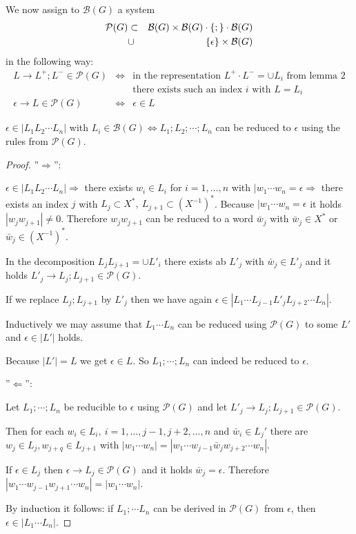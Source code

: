 We now assign to $\mathcal{B}(G)$ a system 
\begin{eqnarray*} 
\mathcal{P}(G) & \subset & \mathcal{B}(G) \times \mathcal{B}(G) \cdot \mbox{$\{;\}$}
\cdot \mathcal{B}(G) \\
& \cup & \mbox{$\{\epsilon\}$} \times \mathcal{B}(G)
\end{eqnarray*}
in the following way:
\begin{eqnarray*}
L \to L^+ ; L^- \in \mathcal{P}(G) & \iff & \text{in the representation } L^+
  \cdot L^- = \cup L_i \text{ from lemma 2} \\
  & & \text {there exists such an index $i$ with $L = L_i$} \\
\epsilon \to L \in \mathcal{P}(G) & \iff & \epsilon \in L
\end{eqnarray*}

\begin{lemma}
$\epsilon \in |L_1 L_2 \cdots L_n|$ with $L_i \in \mathcal{B}(G) \iff
L_1;L_2;\cdots ;L_n$ can be reduced to $\epsilon$ using the rules from
$\mathcal{P}(G)$.
\end{lemma}

\begin{proof}

''$\Rightarrow$'':

$\epsilon \in |L_1 L_2 \cdots L_n| \Rightarrow$ there exists $w_i \in L_i$ for
$i = 1, \ldots, n$ with $|w_1 \cdots w_n = \epsilon \Rightarrow$ there exists an
index $j$ with $L_j \subset X^*,\ L_{j+1} \subset (X^{-1})^*$. Because $|w_1
\cdots w_n = \epsilon$ it holds $|w_j w_{j+1}| \neq 0$. Therefore $w_j w_{j+1}$
can be reduced to a word $\bar{w}_j$ with $\bar{w}_j \in X^*$ or $\bar{w}_j \in
(X^{-1})^*$.

In the decomposition $L_j L_{j+1} = \cup L'_i$ there exists ab $L'_j$ with
$\bar{w}_j \in L'_j$ and it holds $L'_j \to L_j;L_{j+1} \in \mathcal{P}(G)$.

If we replace $L_j;L_{j+1}$ by $L'_j$ then we have again $\epsilon \in |L_1
\cdots L_{j-1} L'_j L_{j+2} \cdots L_n|$.

Inductively we may assume that $L_1 \cdots L_n$ can be reduced using
$\mathcal{P}(G)$ to some $L'$ and $\epsilon \in |L'|$ holds.

Because $|L'| = L$ we get $\epsilon \in L$. So $L_1;\cdots;L_n$ can indeed be
reduced to $\epsilon$.

''$\Leftarrow$'':

Let $L_1;\cdots;L_n$ be reducible to $\epsilon$ using $\mathcal{P}(G)$ and let
$L'_j \to L_j;L_{j+1} \in \mathcal{P}(G)$.

Then for each $w_i \in L_i,\ i = 1,\ldots,j-1,j+2,\ldots,n$ and $\bar{w}_i \in
L_j'$ there are $w_j \in L_j, w_{j+q} \in L_{j+1}$ with $|w_1 \cdots w_n| =
|w_1 \cdots w_{j-1}\bar{w}_j w_{j+2} \cdots w_n|$.

If $\epsilon \in L_j$ then $\epsilon \to L_j \in \mathcal{P}(G)$ and it holds
$\bar{w}_j = \epsilon$. Therefore $|w_1 \cdots w_{j-1} w_{j+1} \cdots w_n| =
|w_1 \cdots w_n|$.

By induction it follows: if $L_1; \cdots L_n$ can be derived in
$\mathcal{P}(G)$ from $\epsilon$, then $\epsilon \in |L_1 \cdots L_n|$.
\end{proof}

